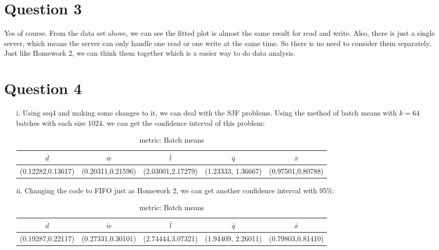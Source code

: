 \documentclass[11pt]{article}
\begin{document}
\section{Question 3}
Yes of course. From the data set above, we can see the fitted plot is almost the same result for read and write. Also, there is just a single server, which means the server can only handle one read or one write at the same time. So there is no need to consider them separately. Just like Homework 2, we can think them together which is a easier way to do data analysis.
\section{Question 4}

\begin{enumerate}
\item[i.]
Using ssq4 and making some changes to it, we can deal with the SJF problems. Using the method of batch means with $k=64$ batches with each size 1024. we can get the confidence interval of this problem:
\begin{table}[htdp]
\caption{metric: Batch means}
\begin{center}
\begin{tabular}{c|c|c|c|c}
 $\overline{d}$ & $\overline{w}$ & $\overline{l}$& $ \overline{q} $ & $ \overline{x} $\\
\hline
(0.12282,0.13617) & (0.20311,0.21596)& (2.03001,2.17279) & (1.23333, 1.36667) & (0.97501,0.80788) \\

\end{tabular}
\end{center}
\label{default}
\end{table}%
\item[ii.]
Changing the code to FIFO just as Homework 2, we can get another confidence interval with 95\%:
\begin{table}[htdp]
\caption{metric: Batch means}
\begin{center}
\begin{tabular}{c|c|c|c|c}
 $\overline{d}$ & $\overline{w}$ & $\overline{l}$& $ \overline{q} $ & $ \overline{x} $\\
\hline
(0.19287,0.22117) & (0.27331,0.30101)& (2.74444,3.07321) & (1.94409, 2.26011) & (0.79803,0.81410) \\


\end{tabular}
\end{center}
\end{table}
\end{enumerate}
\end{document}
